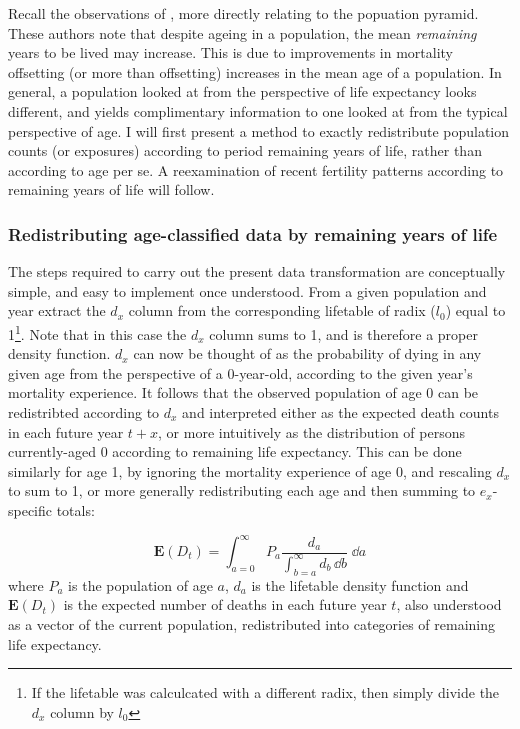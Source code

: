 
Recall the observations of \citet{sanderson2005average}, more directly
relating to the popuation pyramid. These authors note that despite ageing in a
population, the mean \textit{remaining} years to be lived may increase. This is due 
to improvements in mortality offsetting (or more than offsetting) increases in
the mean age of a population. In general, a population looked at from the
perspective of life expectancy looks different, and yields complimentary
information to one looked at from the typical perspective of age. I will first
present a method to exactly redistribute population counts (or exposures) according to 
period remaining years of life, rather than according to age per se. A
reexamination of recent fertility patterns according to remaining years of life
will follow.

\subsubsection{Redistributing age-classified data by remaining years of life}
The steps required to carry out the present data transformation are conceptually
simple, and easy to implement once understood. From a given
population and year extract the $d_x$ column from the corresponding lifetable of
radix ($l_0$) equal to 1\footnote{If the lifetable was calculcated with a
different radix, then simply divide the $d_x$ column by $l_0$}. Note that in
this case the $d_x$ column sums to 1, and is therefore a proper density function. 
$d_x$ can now be thought of as the probability of dying in any given age from the
 perspective of a 0-year-old, according to the given year's mortality experience. 
 It follows that the observed population of age 0 can be redistribted according to
  $d_x$ and interpreted either as the expected death counts in each future year
$t+x$, or more intuitively as the distribution of persons currently-aged 0 according 
to remaining life expectancy. This can be done similarly for age 1, by ignoring the 
mortality experience of age 0, and rescaling $d_x$ to
sum to 1, or more generally redistributing each age and then summing to
$e_x$-specific totals:

\begin{equation}
\label{eq:dxredist}
\mathbf{E}(D_t) = \int _{a = 0} ^{\infty} P_a \frac{d_a}{\int _{b = a} ^{\infty}
d_b\, \dd b} \;\dd a
\end{equation}
where $P_a$ is the population of age $a$, $d_a$ is the
lifetable density function and $\mathbf{E}(D_t)$ is the expected number of
deaths in each future year $t$, also understood as a vector of the current 
population, redistributed into categories of remaining life expectancy. 


